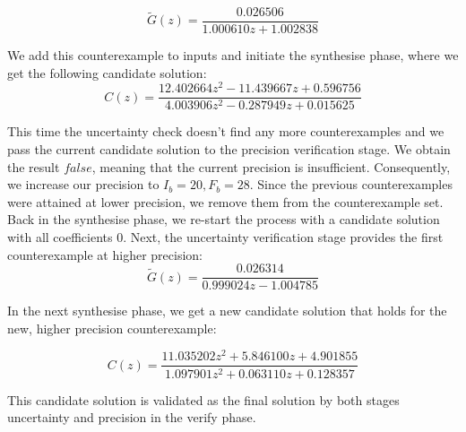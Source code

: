 \documentclass{sig-alternate-05-2015}
\newcommand{\blue}[1]{{\color{blue}#1}}
\newcommand{\red}[1]{{\color{red}#1}}
\begin{document}
$$
\tilde G(z) = \frac{0.026506}{1.000610z+1.002838}
$$



We add this counterexample to {\sc inputs} and initiate the {\sc synthesise} phase, where we get the following candidate solution: 
$$
C(z)=\frac{12.402664z^2{-}11.439667z{+}0.596756}{4.003906z^2{-}0.287949z{+}0.015625}
$$

This time the {\sc uncertainty} check doesn't find any more counterexamples 
and we pass the current candidate solution to the {\sc precision} verification stage.
We obtain the result $false$, meaning that the current precision is insufficient.
Consequently, we increase our precision to $I_b=20,F_b=28$.
%
Since the previous counterexamples were attained at lower precision, we 
remove them from the counterexample set. Back in the {\sc synthesise}
phase, we re-start the process with a candidate solution with all coefficients 0.
Next, the {\sc uncertainty} verification stage provides the first counterexample at higher
precision:
%
$$
\tilde G(z) = \frac{0.026314}{0.999024z{-}1.004785}
$$

In the next {\sc synthesise} phase, we get a new candidate solution that holds for
the new, higher precision counterexample:

$$
C(z)=\frac{11.035202z^2{+}5.846100z{+}4.901855}{1.097901z^2{+}0.063110z{+}0.128357}
$$
%

This candidate solution is validated as the final solution by both stages 
{\sc uncertainty} and {\sc precision} in the
{\sc verify} phase. %
\end{document}
